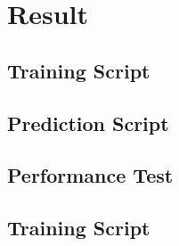 \chapter{Result}

\section{Training Script}
\section{Prediction Script}
\section{Performance Test}
\section{Training Script}


















